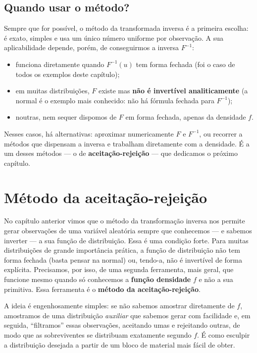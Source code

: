 \documentclass[
  portuguese,
  11pt,
  openany]{book}
\providecommand{\tightlist}{%
  \setlength{\itemsep}{0pt}\setlength{\parskip}{0pt}}
\begin{document}
\section{Quando usar o método?}\label{quando-usar-o-muxe9todo}

Sempre que for possível, o método da transformada inversa é a primeira escolha: é exato,
simples e usa um único número uniforme por observação. A sua aplicabilidade depende,
porém, de conseguirmos a inversa \(F^{-1}\):

\begin{itemize}
\tightlist
\item
  funciona diretamente quando \(F^{-1}(u)\) tem forma fechada (foi o caso de todos os
  exemplos deste capítulo);
\item
  em muitas distribuições, \(F\) existe mas \textbf{não é invertível analiticamente} (a normal é
  o exemplo mais conhecido: não há fórmula fechada para \(F^{-1}\));
\item
  noutras, nem sequer dispomos de \(F\) em forma fechada, apenas da densidade \(f\).
\end{itemize}

Nesses casos, há alternativas: aproximar numericamente \(F\) e \(F^{-1}\), ou recorrer a
métodos que dispensam a inversa e trabalham diretamente com a densidade. É a um desses
métodos --- o de \textbf{aceitação-rejeição} --- que dedicamos o próximo capítulo.

\chapter{Método da aceitação-rejeição}\label{aceitacao-rejeicao}

No capítulo anterior vimos que o método da transformação inversa nos permite
gerar observações de uma variável aleatória sempre que conhecemos --- e sabemos
inverter --- a sua função de distribuição. Essa é uma condição forte. Para muitas
distribuições de grande importância prática, a função de distribuição não tem
forma fechada (basta pensar na normal) ou, tendo-a, não é invertível de forma
explícita. Precisamos, por isso, de uma segunda ferramenta, mais geral, que
funcione mesmo quando só conhecemos a \textbf{função densidade} \(f\) e não a sua
primitiva. Essa ferramenta é o \textbf{método da aceitação-rejeição}.

A ideia é engenhosamente simples: se não sabemos amostrar diretamente de \(f\),
amostramos de uma distribuição \emph{auxiliar} que sabemos gerar com facilidade e,
em seguida, ``filtramos'' essas observações, aceitando umas e rejeitando outras,
de modo que as sobreviventes se distribuam exatamente segundo \(f\). É como
esculpir a distribuição desejada a partir de um bloco de material mais fácil de
obter.
\end{document}
